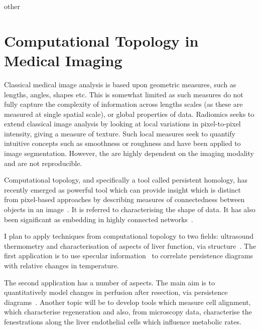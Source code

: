 \documentclass[11pt, a4paper, sans]{moderncv}
\begin{document}
\begin{btUnit}
\begin{btSect}{other} 

\section*{Computational Topology in Medical Imaging}

Classical medical image analysis is based upon geometric measures, such as lengths, angles, shapes etc. This is somewhat limited as such measures do not fully capture the complexity of information across lengths scales (as these are measured at single spatial scale), or global properties of data. Radiomics seeks to extend classical image analysis by looking at local variations in pixel-to-pixel intensity, giving a measure of texture. Such local measures seek to quantify intuitive concepts such as smoothness or roughness and have been applied to image segmentation. However, the are highly dependent on the imaging modality and are not reproducible. 

Computational topology, and specifically a tool called persistent homology, has recently emerged as powerful tool which can provide insight which is distinct from pixel-based approaches by describing measures of connectedness between objects in an image~\cite{lum2013extracting, singh2023topological}. It is referred to characterising the shape of data.  It has also been significant as embedding in highly connected networks~\cite{clough2020topological}. 

I plan to apply techniques from computational topology to two fields: \textcolor{custom}{ultrasound thermometry} and \textcolor{custom}{characterisation of aspects of liver function}, via structure~\cite{rocks2020revealing}. The first application is to use specular information~\cite{harris2010speckle} to correlate persistence diagrams with relative changes in temperature. 

The second application has a number of aspects. The main aim is to quantitatively model changes in perfusion after resection, via persistence diagrams~\cite{takahashi2022analysis}. Another topic will be to develop tools which measure cell alignment, which characterise regeneration and also, from microscopy data, characterise the fenestrations along the liver endothelial cells which influence metabolic rates.

\footnotesize\btPrintCited 

\end{btSect} 
\end{btUnit} 
\end{document}
